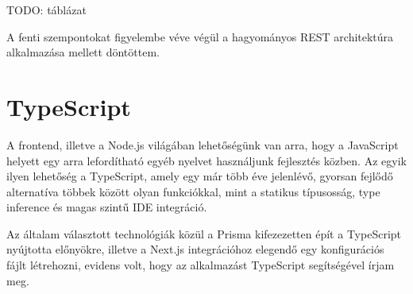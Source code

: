 TODO: táblázat

A fenti szempontokat figyelembe véve végül a hagyományos REST architektúra alkalmazása mellett döntöttem.

\section{TypeScript}
A frontend, illetve a Node.js világában lehetőségünk van arra, hogy a JavaScript helyett egy arra lefordítható
egyéb nyelvet használjunk fejlesztés közben. Az egyik ilyen lehetőség a TypeScript, amely egy már több éve jelenlévő,
gyorsan fejlődő alternatíva többek között olyan funkciókkal, mint a statikus típusosság, type inference és magas szintű IDE
integráció.

Az általam választott technológiák közül a Prisma kifezezetten épít a TypeScript nyújtotta előnyökre, illetve a Next.js
integrációhoz elegendő egy konfigurációs fájlt létrehozni, evidens volt, hogy az alkalmazást TypeScript segítségével írjam meg.
